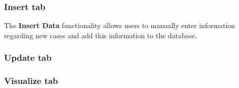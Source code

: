 \documentclass{article}
\begin{document}
\subsubsection{Insert tab}
The {\bf Insert Data} functionality allows users to manually enter information regarding new cases and add this information to the database.

\subsubsection{Update tab}


\subsubsection{Visualize tab}
\end{document}
